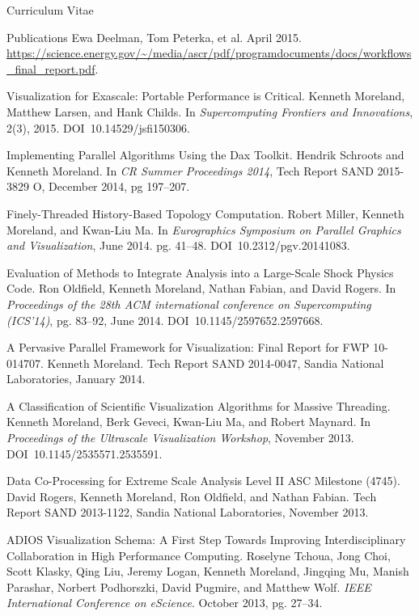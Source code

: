 \documentclass{article}
\begin{document}
\begin{cv}{Curriculum Vitae}
\begin{cvlist}{Publications}
      Ewa Deelman, Tom Peterka, et al.
      April 2015.
      \url{https://science.energy.gov/~/media/ascr/pdf/programdocuments/docs/workflows_final_report.pdf}.
    \item[Visualization for Exascale: Portable Performance is Critical.]
      Kenneth Moreland, Matthew Larsen, and Hank Childs.
      In \emph{Supercomputing Frontiers and Innovations}, 2(3), 2015.
      DOI~10.14529/jsfi150306.
    \item[Implementing Parallel Algorithms Using the Dax Toolkit.]
      Hendrik Schroots and Kenneth Moreland.
      In \emph{CR Summer Proceedings 2014}, Tech Report SAND 2015-3829 O, December 2014, pg 197--207.
    \item[Finely-Threaded History-Based Topology Computation.] Robert
      Miller, Kenneth Moreland, and Kwan-Liu Ma. In \emph{Eurographics
        Symposium on Parallel Graphics and Visualization}, June 2014. pg.
      41--48. DOI~10.2312/pgv.20141083.
    \item[Evaluation of Methods to Integrate Analysis into a Large-Scale
      Shock] Physics Code. Ron Oldfield, Kenneth Moreland, Nathan Fabian,
      and David Rogers. In \emph{Proceedings of the 28th ACM international
        conference on Supercomputing (ICS'14)}, pg. 83--92, June 2014.
      DOI~10.1145/2597652.2597668.
    \item[A Pervasive Parallel Framework for Visualization: Final Report
      for FWP] 10-014707. Kenneth Moreland. Tech Report SAND 2014-0047,
      Sandia National Laboratories, January 2014.
    \item[A Classification of Scientific Visualization Algorithms for
      Massive] Threading. Kenneth Moreland, Berk Geveci, Kwan-Liu Ma, and
      Robert Maynard. In \emph{Proceedings of the Ultrascale Visualization
        Workshop}, November 2013. DOI~10.1145/2535571.2535591.
    \item[Data Co-Processing for Extreme Scale Analysis Level II ASC
      Milestone] (4745). David Rogers, Kenneth Moreland, Ron Oldfield, and
      Nathan Fabian. Tech Report SAND 2013-1122, Sandia National
      Laboratories, November 2013.
    \item[ADIOS Visualization Schema: A First Step Towards Improving]
      Interdisciplinary Collaboration in High Performance Computing.
      Roselyne Tchoua, Jong Choi, Scott Klasky, Qing Liu, Jeremy Logan,
      Kenneth Moreland, Jingqing Mu, Manish Parashar, Norbert Podhorszki,
      David Pugmire, and Matthew Wolf. \emph{IEEE International Conference
        on eScience}. October 2013, pg. 27--34.

\end{cvlist}
\end{cv}
\end{document}
